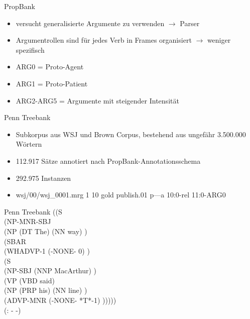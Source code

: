 \documentclass[10pt]{beamer}
\begin{document}
\begin{frame}{PropBank}
  \begin{itemize}
   \item versucht generalisierte Argumente zu verwenden $\rightarrow$ Parser
   \item Argumentrollen sind für jedes Verb in Frames organisiert $\rightarrow$ weniger spezifisch
   \item ARG0 = Proto-Agent
   \item ARG1 = Proto-Patient
   \item ARG2-ARG5 = Argumente mit steigender Intensität
  \end{itemize}
\end{frame}


\begin{frame}{Penn Treebank}
  \begin{itemize}
   \item Subkorpus aus WSJ und Brown Corpus, bestehend aus ungefähr 3.500.000 Wörtern
   \item 112.917 Sätze annotiert nach PropBank-Annotationsschema
   \item 292.975 Instanzen
   \item wsj/00/wsj\_0001.mrg 1 10 gold publish.01 p---a 10:0-rel 11:0-ARG0
          
  \end{itemize}
  
\end{frame}

\begin{frame}{Penn Treebank}
((S \\
\hspace{10pt}   (NP-MNR-SBJ \\
\hspace{25pt}   (NP (DT The) (NN way) ) \\
\hspace{25pt} (SBAR \\
\hspace{40pt}  (WHADVP-1 (-NONE- 0) )\\
\hspace{40pt}   (S \\
\hspace{60pt}      (NP-SBJ (NNP MacArthur) )\\
\hspace{60pt}    (VP (VBD said) \\
\hspace{80pt}       (NP (PRP his) (NN line) )\\
\hspace{80pt}      (ADVP-MNR (-NONE- *T*-1) )))))\\
 (: - -) \\
    

\end{frame}
\end{document}
